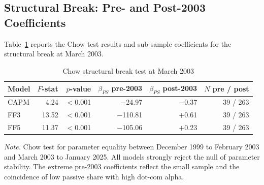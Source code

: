 \documentclass[11pt, a4paper]{article}
\begin{document}
\subsection{Structural Break: Pre- and Post-2003 Coefficients}
\label{app:chow}

Table~\ref{tab:app_chow} reports the Chow test results and sub-sample coefficients for the structural break at March 2003.

\begin{table}[H]
\centering
\caption{Chow structural break test at March 2003}
\label{tab:app_chow}
\small
\begin{tabular}{lrrrrr}
\toprule
\textbf{Model} & \textbf{$F$-stat} & \textbf{$p$-value} & \textbf{$\beta_{PS}$ pre-2003} & \textbf{$\beta_{PS}$ post-2003} & \textbf{$N$ pre / post} \\
\midrule
CAPM & 4.24  & $<$0.001 & $-$24.97  & $-$0.37 & 39 / 263 \\
FF3  & 13.52 & $<$0.001 & $-$110.81 & $+$0.61 & 39 / 263 \\
FF5  & 11.37 & $<$0.001 & $-$105.06 & $+$0.23 & 39 / 263 \\
\bottomrule
\end{tabular}
\begin{flushleft}
\small\textit{Note.} Chow test for parameter equality between December 1999 to February 2003 and March 2003 to January 2025. All models strongly reject the null of parameter stability. The extreme pre-2003 coefficients reflect the small sample and the coincidence of low passive share with high dot-com alpha.
\end{flushleft}
\end{table}
\end{document}
